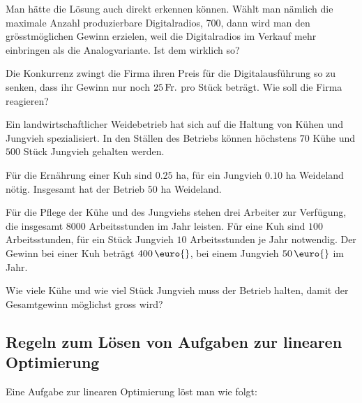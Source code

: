 \documentclass[%
11pt,%
twoside,%
titlepage,%
german,%
headsepline%
]{scrartcl}
\begin{document}
\begin{bem}
Man h\"atte die L\"osung auch direkt erkennen k\"onnen. W\"ahlt man n\"amlich die maximale Anzahl produzierbare Digitalradios, 700, dann wird man den gr\"osstm\"oglichen Gewinn erzielen, weil die Digitalradios im Verkauf mehr einbringen als die Analogvariante. Ist dem wirklich so?
\end{bem}

\begin{ueb}
Die Konkurrenz zwingt die Firma ihren Preis f\"ur die Digitalausf\"uhrung so zu senken, dass ihr Gewinn nur noch $\unit[25]{Fr.}$ pro St\"uck betr\"agt. Wie soll die Firma reagieren?
\end{ueb}

\begin{ueb}
  Ein landwirtschaftlicher Weidebetrieb hat sich auf die Haltung von
  K\"uhen und Jungvieh spezialisiert. In den St\"allen des Betriebs
  k\"onnen h\"ochstens $70$ K\"uhe und $500$ St\"uck Jungvieh gehalten
  werden.

  \noindent F\"ur die Ern\"ahrung einer Kuh sind $0.25$ ha, f\"ur ein
  Jungvieh $0.10$ ha Weideland n\"otig. Insgesamt hat der Betrieb $50$
  ha Weideland.

  \noindent F\"ur die Pflege der K\"uhe und des Jungviehs stehen drei
  Arbeiter zur Verf\"ugung, die insgesamt $8000$ Arbeitsstunden im
  Jahr leisten. F\"ur eine Kuh sind $100$ Arbeitsstunden, f\"ur ein
  St\"uck Jungvieh $10$ Arbeitsstunden je Jahr notwendig. Der Gewinn
  bei einer Kuh betr\"agt $\unit[400]{\euro{}}$, bei einem Jungvieh $\unit[50]{\euro{}}$ im
  Jahr.

  \noindent Wie viele K\"uhe und wie viel St\"uck Jungvieh muss der
  Betrieb halten, damit der Gesamtgewinn m\"oglichst gross wird?
\end{ueb}

\subsection{Regeln zum L\"osen von Aufgaben zur linearen Optimierung}
Eine Aufgabe zur linearen Optimierung l\"ost man wie folgt:
\end{document}
